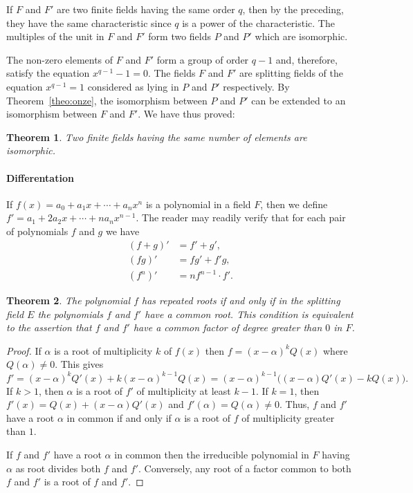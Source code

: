 \documentclass[10pt,leqno]{article}
\newtheorem{theo}{Theorem}
\theoremstyle{definition}
\begin{document}
If $F$ and $F'$ are two finite fields having the same order $q$, then by the preceding, they have the same characteristic since $q$ is a power of the characteristic.
The multiples of the unit in $F$ and $F'$ form two fields $P$ and $P'$ which are isomorphic.

The non-zero elements of $F$ and $F'$ form a group of order $q-1$ and, therefore, satisfy the equation $x^{q-1} - 1 = 0$.
The fields $F$ and $F'$ are splitting fields of the equation $x^{q-1} = 1$ considered as lying in $P$ and $P'$ respectively.
By Theorem~\ref{theo:onze}, the isomorphism between $P$ and $P'$ can be extended to an isomorphism between $F$ and $F'$.
We have thus proved:


\begin{theo}
\label{theo:onei}
Two finite fields having the same number of elements are isomorphic.
\end{theo}



\paragraph{Differentation}
If $f(x) = a_0 + a_1x + \cdots + a_nx^n$ is a polynomial in a field $F$, then we define $f' = a_1 + 2a_2x + \cdots + n a_n x^{n-1}$.
The reader may readily verify that for each pair of polynomials $f$ and $g$ we have
\begin{align*}
(f+g)' &= f' + g',
\\
(fg)' &= fg' + f'g,
\\
(f^n)' &= nf^{n-1} \cdot f'.
\end{align*}

\begin{theo}
\label{theo:onni}
The polynomial $f$ has repeated roots if and only if in the splitting field $E$ the polynomials $f$ and $f'$ have a common root.
This condition is equivalent to the assertion that $f$ and $f'$ have a common factor of degree greater than $0$ in $F$.
\end{theo}

\begin{proof}
If $\alpha$ is a root of multiplicity $k$ of $f(x)$ then $f = (x-\alpha)^k Q(x)$ where $Q(\alpha) \not= 0$.
This gives
\[
f' = (x - \alpha)^k Q'(x) + k (x - \alpha)^{k-1} Q(x)
= (x - \alpha)^{k-1}\bigl(
(x - \alpha) Q'(x) - k Q(x)
\bigr).
\]
If $k > 1$, then $\alpha$ is a root of $f'$ of multiplicity at least $k-1$.
If $k=1$, then $f'(x) = Q(x) + (x -\alpha) Q'(x)$ and $f'(\alpha) = Q(\alpha) \not= 0$.
Thus, $f$ and $f'$ have a root $\alpha$ in common if and only if $\alpha$ is a root of $f$ of multiplicity greater than $1$.

If $f$ and $f'$ have a root $\alpha$ in common then the irreducible polynomial in $F$ having $\alpha$ as root divides both $f$ and $f'$.
Conversely, any root of a factor common to both $f$ and $f'$ is a root of $f$ and $f'$.
\end{proof}
\end{document}
